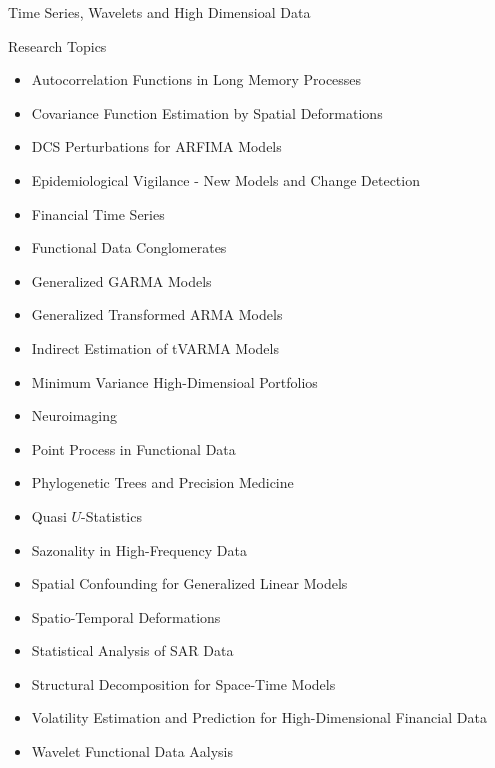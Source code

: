 \documentclass[11pt]{article}
\begin{document}
\vspace{1cm}
\thispagestyle{empty}

\begin{center}
{\huge Time Series, Wavelets and High Dimensioal Data}
\end{center}
\vspace*{1cm}
{\sc Research Topics}
\begin{itemize}
\item Autocorrelation Functions in Long Memory Processes
\item Covariance Function Estimation by Spatial Deformations
\item DCS Perturbations for ARFIMA Models 
\item Epidemiological  Vigilance - New Models and Change Detection
\item Financial Time Series
\item Functional Data Conglomerates
\item Generalized GARMA Models
\item Generalized Transformed ARMA Models
\item Indirect Estimation of tVARMA Models
\item Minimum Variance High-Dimensioal Portfolios 
\item Neuroimaging
\item Point Process in Functional Data
\item Phylogenetic Trees and Precision Medicine
\item Quasi $U$-Statistics
\item Sazonality in High-Frequency Data
\item Spatial Confounding for Generalized Linear Models
\item Spatio-Temporal Deformations
\item Statistical Analysis of SAR Data
\item Structural Decomposition for Space-Time Models
\item Volatility Estimation and Prediction for High-Dimensional Financial Data
\item Wavelet Functional Data Aalysis
\end{itemize}
\end{document}
